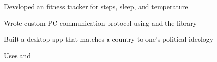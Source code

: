 \documentclass[]{deedy-resume-openfont}
\begin{document}
\begin{minipage}[t]{0.66\textwidth}
\descript{}
\begin{tightemize}
\item Developed an  fitness tracker for steps, sleep, and temperature
\item Wrote custom PC communication protocol using  and the  library
\end{tightemize}
\sectionsep

\descript{}
\begin{tightemize}
\item Built a desktop app that matches a country to one's political ideology
\item Uses  and 
\end{tightemize}
\sectionsep

%
%




\end{minipage}
\end{document}
